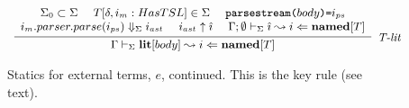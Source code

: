 \begin{figure}
\centering
\[
\footnotesize
\begin{array}{c}
\infer[\textit{T-lit}]
	  {\Gamma \vdash_\Sigma \keyw{lit}[body] \leadsto i \Leftarrow \keyw{named}[T]}
	  {\begin{array}{c}
	   \Sigma_0 \subset \Sigma ~~~~
	   T[\delta, i_m : HasTSL] \in \Sigma ~~~~
	   \texttt{parsestream(}body\texttt{)=}i_{ps} \\
	   i_m.parser.parse(i_{ps}) \Downarrow_\Sigma i_{ast}~~~~
	   i_{ast} \uparrow \ih~~~~
	   \Gamma; \emptyset \vdash_\Sigma \ih \leadsto i \Leftarrow \keyw{named}[T]
	   \end{array}}
\end{array}
\]
\vspace{-10px}
\caption{Statics for external terms, $e$, continued. This is the key rule (see text).}
\label{fig:statics-lit}
\end{figure}
\newcommand{\Gout}{\Gamma_{\text{o}}}
\newcommand{\Gin}{\Gamma}
